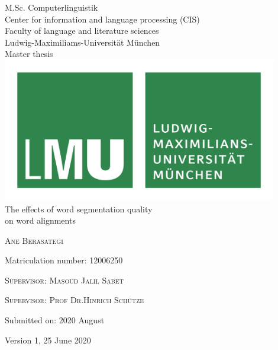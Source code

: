 %
%

\begin{titlepage}
	\begin{center}
		\normalsize
		M.Sc. Computerlinguistik \\
		Center for information and language processing (CIS)  \\
		Faculty of language and literature sciences \\
		Ludwig-Maximiliams-Universität München \\
		\vspace{1cm} %
		\huge
		Master thesis \\
		\vspace{1.5cm}
		\includegraphics[width=12cm]{figures/lmu_logo.png} \\ %
		\vspace{1cm}
		\Huge 
		The effects of word segmentation quality \\
		on word alignments \\
		\vspace{1cm}
		{\Large\scshape Ane Berasategi \par}
		\normalsize
		{Matriculation number: 12006250 \par}
		\vfill
		\vspace{1.5cm}
		{\scshape Supervisor: Masoud Jalil Sabet \par}
		{\scshape Supervisor: Prof Dr.Hinrich Schütze \par}
		{Submitted on: 2020 August \par} %
		\vspace{1cm}
		\tiny Version 1, 25 June 2020
	\end{center}
	\vfill %
\end{titlepage}

